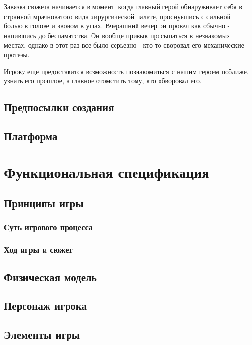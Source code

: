 \documentclass{article}
\begin{document}
Завязка сюжета начинается в момент, когда главный герой обнаруживает себя в
странной мрачноватого вида хирургической палате, проснувшись с сильной болью в
голове и звоном в ушах. Вчерашний вечер он провел как обычно - напившись до
беспамятства. Он вообще привык просыпаться в незнакомых местах, однако в этот раз все
было серьезно - кто-то своровал его механические протезы.

Игроку еще предоставится возможность познакомиться с нашим героем поближе,
узнать его прошлое, а главное отомстить тому, кто обворовал его. 
\subsection{Предпосылки создания}

\subsection{Платформа}

\section{Функциональная спецификация}

\subsection{Принципы игры}

\subsubsection{Суть игрового процесса}

\subsubsection{Ход игры и сюжет}

\subsection{Физическая модель}

\subsection{Персонаж игрока}

\subsection{Элементы игры}
\end{document}
